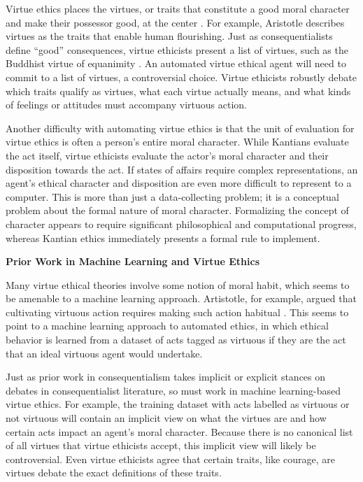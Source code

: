 \begin{isabellebody}
\isadelimdocument
%
\endisadelimdocument
%
\isatagdocument
%
\isamarkuptrue%
%
\endisatagdocument
{\isafolddocument}%
%
\isadelimdocument
%
\endisadelimdocument
%
\begin{isamarkuptext}%
Virtue ethics places the virtues, or traits that constitute a good moral character and make 
their possessor good, at the center \citep{vesep}. For example, Aristotle describes virtues as the 
traits that enable human flourishing. Just as consequentialists define ``good'' consequences, virtue 
ethicists present a list of virtues, such as the Buddhist virtue of equanimity \citep{mcrae}. An automated virtue 
ethical agent will need to commit to a list of virtues, a controversial choice. 
Virtue ethicists robustly debate which traits qualify as virtues, what each virtue actually means, and 
what kinds of feelings or attitudes must accompany virtuous action. 

Another difficulty with automating virtue ethics is that the unit of evaluation for virtue ethics
is often a person's entire moral character. While Kantians evaluate the act itself, virtue ethicists 
evaluate the actor's moral character and their 
disposition towards the act. If states of affairs
require complex representations, an agent's ethical character and disposition are even more difficult
to represent to a computer. This is more than just a data-collecting problem; it is a conceptual problem 
about the formal nature of moral character.
Formalizing the concept of character appears to require significant philosophical and computational
progress, whereas Kantian ethics immediately presents a formal rule to implement.%
\end{isamarkuptext}\isamarkuptrue%
%
\begin{isamarkuptext}%
\noindent \textbf{Prior Work in Machine Learning and Virtue Ethics}%
\end{isamarkuptext}\isamarkuptrue%
%
\begin{isamarkuptext}%
Many virtue ethical theories involve some notion of 
moral habit, which seems to be amenable to a machine learning approach. Artistotle, for example, argued 
that cultivating virtuous action requires making such action habitual \citep{aristotle}. This seems to 
point to a machine learning approach to automated ethics, in which ethical behavior is learned from a 
dataset of acts tagged as virtuous if they are the act that an ideal virtuous agent would undertake. 

Just as prior work in consequentialism takes implicit or explicit stances on debates in consequentialist
literature, so must work in machine learning-based virtue ethics. For example, the training 
dataset with acts labelled as virtuous or not virtuous will contain an implicit view on what the virtues
are and how certain acts impact an agent's moral character. Because there is no canonical list of all virtues
that virtue ethicists accept, this implicit view will likely be controversial. Even virtue ethicists agree
that certain traits, like courage, are virtues debate the exact definitions of these traits. 


\end{isamarkuptext}
\end{isabellebody}
